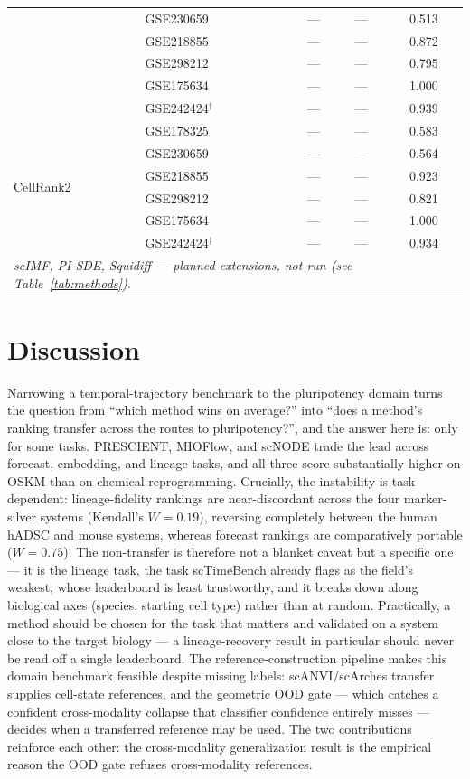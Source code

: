 \documentclass[11pt]{article}
\begin{document}
\begin{table}[ht]
\begin{tabular}{l l c c c}
 & GSE230659 & --- & --- & 0.513 \\
 & GSE218855 & --- & --- & 0.872 \\
 & GSE298212 & --- & --- & 0.795 \\
 & GSE175634 & --- & --- & 1.000 \\
 & GSE242424$^{\dagger}$ & --- & --- & 0.939 \\
\midrule
\multirow{6}{*}{CellRank2} & GSE178325 & --- & --- & 0.583 \\
 & GSE230659 & --- & --- & 0.564 \\
 & GSE218855 & --- & --- & 0.923 \\
 & GSE298212 & --- & --- & 0.821 \\
 & GSE175634 & --- & --- & 1.000 \\
 & GSE242424$^{\dagger}$ & --- & --- & 0.934 \\
\midrule
\multicolumn{5}{l}{\emph{scIMF, PI-SDE, Squidiff --- planned extensions, not run (see Table~\ref{tab:methods}).}}\\
\bottomrule
\end{tabular}
\end{table}

\section{Discussion}
Narrowing a temporal-trajectory benchmark to the pluripotency domain turns the
question from ``which method wins on average?'' into ``does a method's ranking
transfer across the routes to pluripotency?'', and the answer here is: only for some
tasks. PRESCIENT, MIOFlow, and scNODE trade the lead across forecast, embedding, and
lineage tasks, and all three score substantially higher on OSKM than on chemical
reprogramming. Crucially, the instability is task-dependent: lineage-fidelity rankings
are near-discordant across the four marker-silver systems (Kendall's $W=0.19$),
reversing completely between the human hADSC and mouse systems, whereas forecast
rankings are comparatively portable ($W=0.75$). The non-transfer is therefore not a
blanket caveat but a specific one --- it is the lineage task, the task scTimeBench
already flags as the field's weakest, whose leaderboard is least trustworthy, and it
breaks down along biological axes (species, starting cell type) rather than at random.
Practically, a method should be chosen for the task that matters and validated on a
system close to the target biology --- a lineage-recovery result in particular should
never be read off a single leaderboard. The
reference-construction pipeline makes this domain benchmark feasible despite missing
labels: scANVI/scArches transfer supplies cell-state references, and the geometric OOD
gate --- which catches a confident cross-modality collapse that classifier confidence
entirely misses --- decides when a transferred reference may be used. The two
contributions reinforce each other: the cross-modality generalization result is the
empirical reason the OOD gate refuses cross-modality references.
\end{document}
